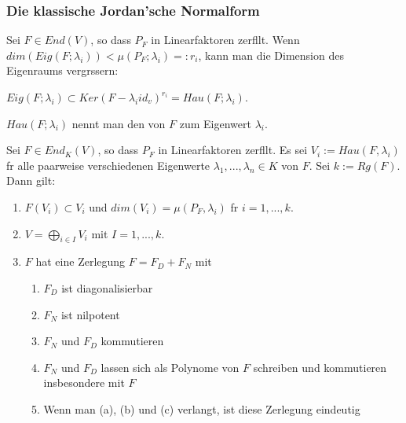 \documentclass[9pt, a4paper, twocolumn, landscape]{article}
\begin{document}
\subsubsection{Die klassische Jordan'sche Normalform}
\begin{definition}
Sei $F \in End(V)$, so dass $P_F$ in Linearfaktoren zerf\aee llt. Wenn $dim(Eig(F; \lambda_i)) < \mu (P_F; \lambda_i) =: r_i$, kann man die Dimension des Eigenraums vergr\oee ssern: 
\\ \centerline{$Eig(F; \lambda_i) \subset Ker(F - \lambda_i id_v)^{r_i} = Hau(F; \lambda_i)$. }
$Hau(F; \lambda_i)$ nennt man den  von $F$ zum Eigenwert $\lambda_i$.
\end{definition}
\begin{theorem} 
Sei $F \in End_K(V)$, so dass $P_F$ in Linearfaktoren zerf\aee llt. Es sei $V_i := Hau(F, \lambda_i)$ f\uee r alle paarweise verschiedenen Eigenwerte $\lambda_1, ... , \lambda_n \in K$ von $F$. Sei $k := Rg(F)$. Dann gilt:
\begin{enumerate}
\item $F(V_i) \subset V_i$ und $dim(V_i) = \mu (P_F, \lambda_i)$ f\uee r $i = 1, ..., k$. 
\item $V =\bigoplus\limits_{i \in I} V_i$ mit $I=1, ..., k$.
\item $F$ hat eine Zerlegung $F = F_D + F_N$ mit
\begin{enumerate}
\item $F_D$ ist diagonalisierbar
\item$ F_N$ ist nilpotent
\item $F_N$ und $F_D$ kommutieren
\item $F_N$ und $F_D$ lassen sich als Polynome von $F$ schreiben und kommutieren insbesondere mit $F$
\item Wenn man (a), (b) und (c) verlangt, ist diese Zerlegung eindeutig
\end{enumerate}
\end{enumerate}
\end{theorem}
\end{document}
